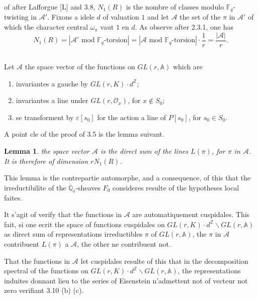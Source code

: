 \documentclass[11pt,a4paper]{article}
\theoremstyle{plain}
\newtheorem{lemma}[theorem]{Lemma}
\theoremstyle{definition}
\newcommand{\Z}{\mathbb{Z}}
\newcommand{\F}{\mathbb{F}}
\newcommand{\Ql}{\overline{\mathbb{Q}}_\ell}
\begin{document}
of after Lafforgue [L] and 3.8, $N_1(R)$ is the nombre of classes modulo $\F_q$-twisting in $\mathcal{A}'$. Fixons a idele $d$ of valuation $1$ and let $\mathcal{A}$ the set of the $\pi$ in $\mathcal{A}'$ of which the character central $\omega_\pi$ vaut $1$ en $d$. As observe after 2.3.1, one has
\begin{equation}
N_1(R) = |\mathcal{A}' \text{ mod } \F_q\text{-torsion}| = |\mathcal{A} \text{ mod } \F_q\text{-torsion}| \cdot \frac{1}{r} = \frac{|\mathcal{A}|}{r}.
\tag{3.9.1}
\end{equation}

\subsection{}
Let $\mathcal{A}$ the space vector of the functions on $GL(r, \mathbb{A})$ which are
\begin{enumerate}[label=(\alph*)]
\item invariantes a gauche by $GL(r, K) \cdot d^\Z$;
\item invariantes a line under $GL(r, \mathcal{O}_x)$, for $x \notin S_0$;
\item se transforment by $\varepsilon[s_0]$ for the action a line of $P[s_0]$, for $s_0 \in S_0$.
\end{enumerate}

A point cle of the proof of 3.5 is the lemma suivant.

\begin{lemma}
the space vector $\mathcal{A}$ is the direct sum of the lines $L(\pi)$, for $\pi$ in $\mathcal{A}$. It is therefore of dimension $r N_1(R)$.
\end{lemma}

This lemma is the contrepartie automorphe, and a consequence, of this that the irreductibilite of the $\Ql$-sheaves $F_0$ consideres resulte of the hypotheses local faites.

It s'agit of verify that the functions in $\mathcal{A}$ are automatiquement cuspidales. This fait, si one ecrit the space of functions cuspidales on $GL(r, K) \cdot d^\Z \backslash GL(r, \mathbb{A})$ as direct sum of representations irreductibles $\pi$ of $GL(r, \mathbb{A})$, the $\pi$ in $\mathcal{A}$ contribuent $L(\pi)$ a $\mathcal{A}$, the other ne contribuent not.

That the functions in $\mathcal{A}$ let cuspidales resulte of this that in the decomposition spectral of the functions on $GL(r, K) \cdot d^\Z \backslash GL(r, \mathbb{A})$, the representations induites donnant lieu to the series of Eisenstein n'admettent not of vecteur not zero verifiant 3.10 (b) (c).
\end{document}
